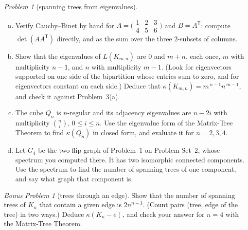 \documentclass[11pt,twoside]{amsart}
\theoremstyle{plain}
\theoremstyle{remark}
\newtheorem{prob}{Problem}
\newtheorem*{bonus*}{Bonus Problem}
\theoremstyle{definition}
\newcommand{\kap}{\kappa}
\begin{document}
\begin{prob}[spanning trees from eigenvalues]
\begin{enumerate}[(a)]
\item Verify Cauchy--Binet by hand for
$A=\bigl(\begin{smallmatrix}1&2&3\\4&5&6\end{smallmatrix}\bigr)$ and $B=A^{\mathsf T}$:
compute $\det(AA^{\mathsf T})$ directly, and as the sum over the three $2$-subsets of columns.
\item Show that the eigenvalues of $L(K_{m,n})$ are $0$ and $m+n$, each once, $m$ with
multiplicity $n-1$, and $n$ with multiplicity $m-1$. (Look for eigenvectors supported on one
side of the bipartition whose entries sum to zero, and for eigenvectors constant on each side.)
Deduce that $\kap(K_{m,n})=m^{\,n-1}n^{\,m-1}$, and check it against Problem~3(a).
\item The cube $Q_n$ is $n$-regular and its adjacency eigenvalues are $n-2i$ with multiplicity
$\binom ni$, $0\le i\le n$. Use the eigenvalue form of the Matrix-Tree Theorem to find
$\kap(Q_n)$ in closed form, and evaluate it for $n=2,3,4$.
\item Let $G_4$ be the two-flip graph of Problem~1 on Problem Set~2, whose spectrum you
computed there. It has two isomorphic connected components. Use the spectrum to find the
number of spanning trees of one component, and say what graph that component is.
\end{enumerate}
\end{prob}

\begin{bonus*}[trees through an edge]
Show that the number of spanning trees of $K_n$ that contain a given edge is $2n^{n-3}$.
(Count pairs (tree, edge of the tree) in two ways.) Deduce $\kap(K_n-e)$, and check your
answer for $n=4$ with the Matrix-Tree Theorem.
\end{bonus*}
\end{document}
